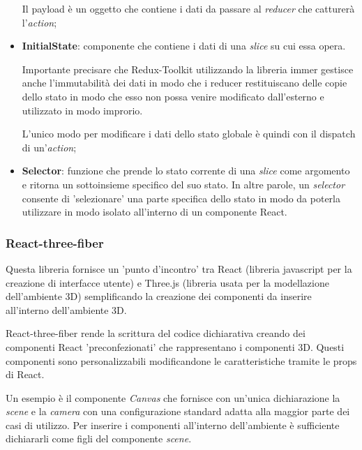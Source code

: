 \begin{itemize}
	Il payload è un oggetto che contiene i dati da passare al \textit{reducer} che catturerà l'\textit{action};
	\item \textbf{InitialState}: componente che contiene i dati di una \textit{slice} su cui essa opera. 
	
	Importante precisare che Redux-Toolkit utilizzando 
	la libreria immer gestisce anche l'immutabilità dei dati in modo che i reducer restituiscano delle copie dello stato in modo che esso non possa 
	venire modificato dall'esterno e utilizzato in modo improrio.
	
	L'unico modo per modificare i dati dello stato globale è quindi con il dispatch di un'\textit{action};
	\item \textbf{Selector}: funzione che prende lo stato corrente di una \textit{slice} come argomento e ritorna un sottoinsieme specifico
	del suo stato. In altre parole, un \textit{selector} consente di 'selezionare' una parte specifica dello stato
	in modo da poterla utilizzare in modo isolato all'interno di un componente React.
\end{itemize}

\subsubsection{React-three-fiber}
Questa libreria fornisce un 'punto d'incontro' tra React (libreria javascript per la creazione di interfacce utente) e Three.js (libreria usata per
la modellazione dell'ambiente 3D) semplificando la creazione dei componenti da inserire all'interno dell'ambiente 3D.

React-three-fiber rende la scrittura del codice dichiarativa creando dei componenti React 'preconfezionati' che rappresentano i componenti 3D.
Questi componenti sono personalizzabili modificandone le caratteristiche tramite le props di React.

Un esempio è il componente \textit{Canvas} che fornisce con un'unica dichiarazione la \textit{scene} e la \textit{camera} con una configurazione standard 
adatta alla maggior parte dei casi di utilizzo. Per inserire i componenti all'interno dell'ambiente è sufficiente dichiararli come figli del 
componente \textit{scene}.
